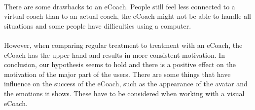 \documentclass[english,a4paper,pdftex]{report}
\begin{document}
\paragraph{}
There are some drawbacks to an eCoach. People still feel less connected to a virtual coach than to an actual coach, the eCoach might not be able to handle all situations and some people have difficulties using a computer.
\paragraph{}
However, when comparing regular treatment to treatment with an eCoach, the eCoach has the upper hand and results in more consistent motivation. In conclusion, our hypothesis seems to hold and there is a positive effect on the motivation of the major part of the users. There are some things that have influence on the success of the eCoach, such as the appearance of the avatar and the emotions it shows. These have to be considered when working with a visual eCoach.





\end{document}
